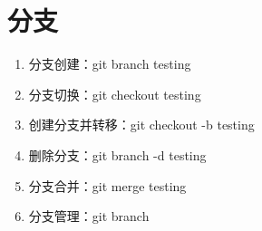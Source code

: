 \documentclass{article}
\begin{document}
	\section{分支}
	\begin{enumerate}
		\item 分支创建：git branch testing
		
		\item  分支切换：git checkout testing
		
		\item 创建分支并转移：git checkout -b testing
		
		\item 删除分支：git branch -d testing
		
		\item 分支合并：git merge testing
		
		\item 分支管理：git branch
		
		
	\end{enumerate}
\end{document}
